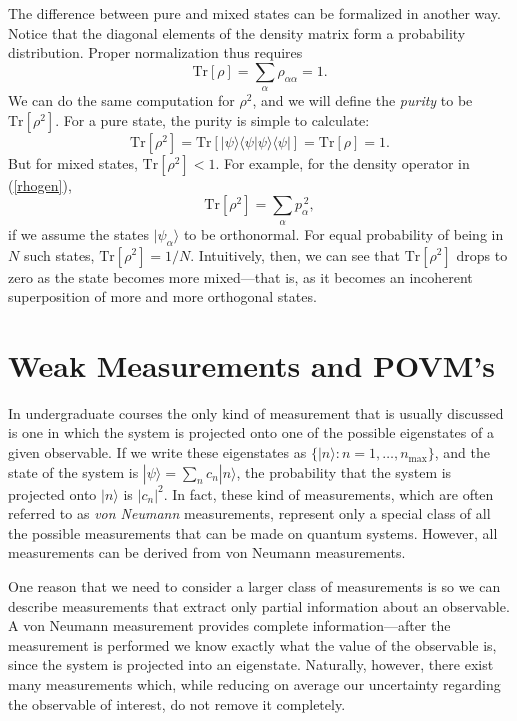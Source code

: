 \documentclass[12pt,aps,onecolum,superscriptaddress,footinbib,floatfix,showpacs]{revtex4-1}
\def\ket#1{|{#1}\rangle}
\def\bra#1{\langle{#1}|}
\begin{document}
The difference between pure and mixed states can be formalized in
another way.  Notice that the diagonal elements of the density matrix
form a probability distribution.  Proper normalization thus requires
\begin{equation}
  \mathrm{Tr}[\rho] = \sum_\alpha \rho_{\alpha\alpha} = 1.
\end{equation}
We can do the same computation for $\rho^2$, and we will
define the \textit{purity} to be $\mathrm{Tr}[\rho^2]$.
For a pure state,
the purity is simple to calculate:
\begin{equation}
  \mathrm{Tr}[\rho^2] = \mathrm{Tr}[\ket\psi\langle\psi|\psi\rangle\bra\psi]
  = \mathrm{Tr}[\rho] = 1.
\end{equation}
But for mixed states, $\mathrm{Tr}[\rho^2] < 1$.  For example, 
for the density operator in (\ref{rhogen}),
\begin{equation}
  \mathrm{Tr}[\rho^2] = \sum_\alpha p_\alpha^{\,2},
\end{equation}
if we assume the states $\ket{\psi_\alpha}$ to be orthonormal.
For equal probability of being in $N$ such states, 
$\mathrm{Tr}[\rho^2]=1/N$.  Intuitively, then, we can see
that $\mathrm{Tr}[\rho^2]$ drops to zero as the state becomes
more mixed---that is, as it becomes an incoherent superposition
of more and more orthogonal states.


\section{Weak Measurements and POVM's}
\label{section:weak}

In undergraduate courses the only kind of measurement that is
usually discussed is one in which the system is projected onto one
of the possible eigenstates of a given observable. If we write
these eigenstates as $\{|n\rangle :
n=1,\ldots,n_\mathrm{max}\}$, 
and the state of the
system is $|\psi\rangle = \sum_n c_n |n\rangle$, the probability
that the system is projected onto $|n\rangle$ is $|c_n|^2$. In
fact, these kind of measurements, which are often referred to as
{\em von Neumann} measurements, represent only a special class of
all the possible measurements that can be made on quantum
systems. However, all measurements can be derived from von Neumann
measurements.

One reason that we need to consider a larger class of measurements
is so we can describe measurements that extract only partial
information about an observable. A von Neumann measurement
provides complete information---after the measurement is
performed we know exactly what the value of the observable is,
since the system is projected into an eigenstate. Naturally,
however, there exist many measurements which, while reducing on
average our uncertainty regarding the observable of interest, do
not remove it completely.
\end{document}
